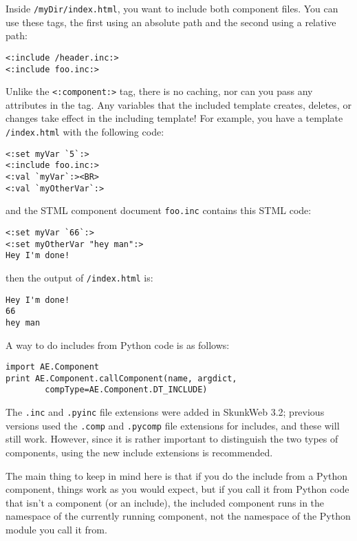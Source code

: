 \documentclass{manual}
\begin{document}
Inside \texttt{/myDir/index.html}, you want to include both
component files. You can use these tags, the first using an absolute
path and the second using a relative path:

\begin{verbatim}<:include /header.inc:>
<:include foo.inc:>
\end{verbatim}

Unlike the \texttt{<:component:>} 
tag, there is no caching, nor can you pass any attributes 
in the tag. Any variables that the included template creates, 
deletes, or changes take effect in the including template! 
For example, you have a template \texttt{/index.html} with 
the following code:

\begin{verbatim}<:set myVar `5`:>
<:include foo.inc:>
<:val `myVar`:><BR>
<:val `myOtherVar`:>
\end{verbatim}

and the STML component document \texttt{foo.inc} 
contains this STML code:

\begin{verbatim}<:set myVar `66`:>
<:set myOtherVar "hey man":>
Hey I'm done!
\end{verbatim}

then the output of \texttt{/index.html} is:

\begin{verbatim}Hey I'm done!
66
hey man
\end{verbatim}

A way to do includes from Python code is as follows:
\begin{verbatim}
import AE.Component
print AE.Component.callComponent(name, argdict, 
        compType=AE.Component.DT_INCLUDE)
\end{verbatim}

 The \texttt{.inc} and \texttt{.pyinc} file
extensions were added in SkunkWeb 3.2; previous versions used the
\texttt{.comp} and \texttt{.pycomp} file extensions for includes, and
these will still work.  However, since it is rather important to
distinguish the two types of components, using the new include
extensions is recommended.


 The main thing to keep in mind here is that if you do
the include from a Python component, things work as you would expect,
but if you call it from Python code that isn't a component (or an
include), the included component runs in the namespace of the
currently running component, not the namespace of the Python module
you call it from.
\end{document}
